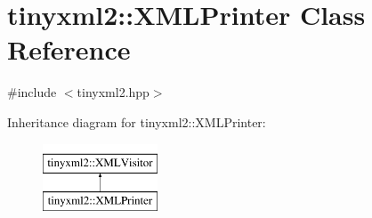 \hypertarget{classtinyxml2_1_1_x_m_l_printer}{\section{tinyxml2\-:\-:X\-M\-L\-Printer Class Reference}
\label{classtinyxml2_1_1_x_m_l_printer}
}


{\ttfamily \#include $<$tinyxml2.\-hpp$>$}

Inheritance diagram for tinyxml2\-:\-:X\-M\-L\-Printer\-:\begin{figure}[H]
\begin{center}
\leavevmode
\includegraphics[height=2.000000cm]{classtinyxml2_1_1_x_m_l_printer}
\end{center}
\end{figure}
